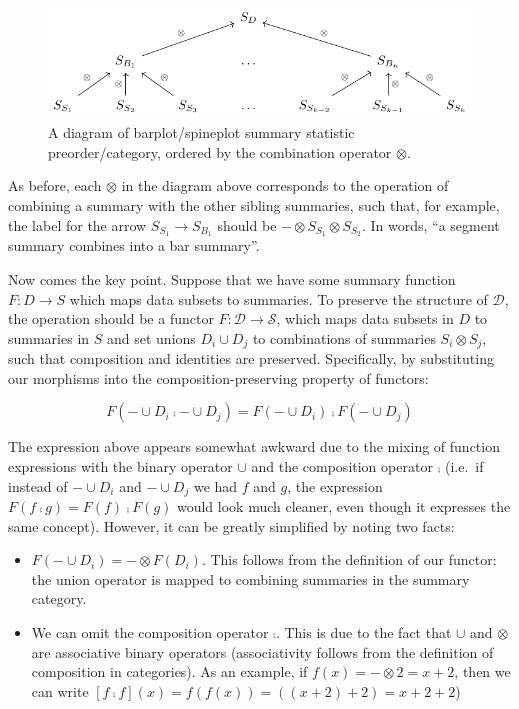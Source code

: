 \documentclass[
]{book}
\providecommand{\tightlist}{%
  \setlength{\itemsep}{0pt}\setlength{\parskip}{0pt}}
\theoremstyle{definition}
\theoremstyle{definition}
\theoremstyle{definition}
\theoremstyle{definition}
\theoremstyle{remark}
\begin{document}
\begin{figure}

{\centering \includegraphics[width=1\linewidth,height=1\textheight]{./figures/barplot-preorder4} 

}

\caption{A diagram of barplot/spineplot summary statistic preorder/category, ordered by the combination operator $\otimes$.}\label{fig:barplot-preorder4}
\end{figure}

As before, each \(\otimes\) in the diagram above corresponds to the operation of combining a summary with the other sibling summaries, such that, for example, the label for the arrow \(S_{S_1} \to S_{B_1}\) should be \(- \otimes S_{S_1} \otimes S_{S_2}\). In words, ``a segment summary combines into a bar summary''.

Now comes the key point. Suppose that we have some summary function \(F: D \to S\) which maps data subsets to summaries. To preserve the structure of \(\mathcal{D}\), the operation should be a functor \(F: \mathcal{D} \to \mathcal{S}\), which maps data subsets in \(D\) to summaries in \(S\) and set unions \(D_i \cup D_j\) to combinations of summaries \(S_i \otimes S_j\), such that composition and identities are preserved. Specifically, by substituting our morphisms into the composition-preserving property of functors:

\[F(- \cup D_{i} ⨾- \cup D_{j}) = F(- \cup D_i) ⨾F(- \cup D_j)\]

The expression above appears somewhat awkward due to the mixing of function expressions with the binary operator \(\cup\) and the composition operator \(⨾\) (i.e.~if instead of \(- \cup D_i\) and \(- \cup D_j\) we had \(f\) and \(g\), the expression \(F(f ⨾g) = F(f) ⨾F(g)\) would look much cleaner, even though it expresses the same concept). However, it can be greatly simplified by noting two facts:

\begin{itemize}
\tightlist
\item
  \(F(- \cup D_i ) = - \otimes F(D_i)\). This follows from the definition of our functor: the union operator is mapped to combining summaries in the summary category.
\item
  We can omit the composition operator \(⨾\). This is due to the fact that \(\cup\) and \(\otimes\) are associative binary operators (associativity follows from the definition of composition in categories). As an example, if \(f(x) = - \otimes 2 = x + 2\), then we can write \([f ⨾f](x) = f(f(x)) = ((x + 2) + 2) = x + 2 + 2\))
\end{itemize}
\end{document}
